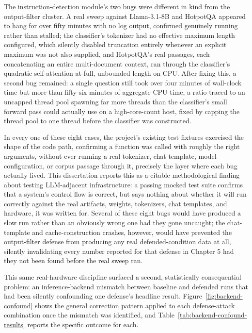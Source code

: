 The instruction-detection module's two bugs were different in kind from
the output-filter cluster. A real sweep against Llama-3.1-8B and
HotpotQA appeared to hang for over fifty minutes with no log output,
confirmed genuinely running rather than stalled; the classifier's
tokenizer had no effective maximum length configured, which silently
disabled truncation entirely whenever an explicit maximum was not also
supplied, and HotpotQA's real passages, each concatenating an entire
multi-document context, ran through the classifier's quadratic
self-attention at full, unbounded length on CPU. After fixing this, a
second bug remained: a single question still took over four minutes of
wall-clock time but more than fifty-six minutes of aggregate CPU time, a
ratio traced to an uncapped thread pool spawning far more threads than
the classifier's small forward pass could actually use on a
high-core-count host, fixed by capping the thread pool to one thread
before the classifier was constructed.

In every one of these eight cases, the project's existing test fixtures
exercised the shape of the code path, confirming a function was called
with roughly the right arguments, without ever running a real tokenizer,
chat template, model configuration, or corpus passage through it,
precisely the layer where each bug actually lived. This dissertation
reports this as a citable methodological finding about testing
LLM-adjacent infrastructure: a passing mocked test suite confirms that a
system's control flow is correct, but says nothing about whether it will
run correctly against the real artifacts, weights, tokenizers, chat
templates, and hardware, it was written for. Several of these eight bugs
would have produced a slow run rather than an obviously wrong one had
they gone uncaught; the chat-template and cache-construction crashes,
however, would have prevented the output-filter defense from producing
any real defended-condition data at all, silently invalidating every
number reported for that defense in Chapter 5 had they not been found
before the real sweep ran.

This same real-hardware discipline surfaced a second, statistically
consequential problem: an inference-backend mismatch between baseline
and defended runs that had been silently confounding one defense's
headline result. Figure~\ref{fig:backend-confound} shows the general
correction pattern applied to each defense-attack combination once the
mismatch was identified, and Table~\ref{tab:backend-confound-results}
reports the specific outcome for each.

